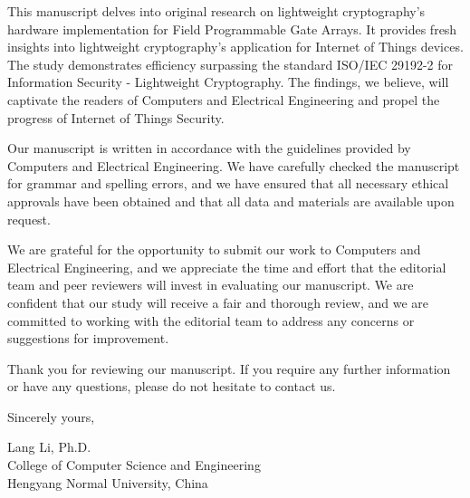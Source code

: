 \documentclass{article}
\begin{document}
This manuscript delves into original research on lightweight cryptography's hardware implementation for Field Programmable Gate Arrays. It provides fresh insights into lightweight cryptography's application for Internet of Things devices. The study demonstrates efficiency surpassing the standard ISO/IEC 29192-2 for Information Security - Lightweight Cryptography. The findings, we believe, will captivate the readers of Computers and Electrical Engineering and propel the progress of Internet of Things Security.

Our manuscript is written in accordance with the guidelines provided by Computers and Electrical Engineering. We have carefully checked the manuscript for grammar and spelling errors, and we have ensured that all necessary ethical approvals have been obtained and that all data and materials are available upon request.

We are grateful for the opportunity to submit our work to Computers and Electrical Engineering, and we appreciate the time and effort that the editorial team and peer reviewers will invest in evaluating our manuscript. We are confident that our study will receive a fair and thorough review, and we are committed to working with the editorial team to address any concerns or suggestions for improvement.

Thank you for reviewing our manuscript. If you require any further information or have any questions, please do not hesitate to contact us.

\bigskip %

Sincerely yours,

\vspace{20pt} %


Lang Li, Ph.D. \\
College of Computer Science and Engineering\\
Hengyang Normal University, China \\
\end{document}
